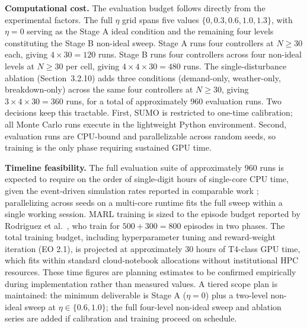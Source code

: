 \textbf{Computational cost.} The evaluation budget follows directly from the experimental factors. The full $\eta$ grid spans five values $\{0, 0.3, 0.6, 1.0, 1.3\}$, with $\eta = 0$ serving as the Stage A ideal condition and the remaining four levels constituting the Stage B non-ideal sweep. Stage A runs four controllers at $N \geq 30$ each, giving $4 \times 30 = 120$ runs. Stage B runs four controllers across four non-ideal levels at $N \geq 30$ per cell, giving $4 \times 4 \times 30 = 480$ runs. The single-disturbance ablation (Section~3.2.10) adds three conditions (demand-only, weather-only, breakdown-only) across the same four controllers at $N \geq 30$, giving $3 \times 4 \times 30 = 360$ runs, for a total of approximately 960 evaluation runs. Two decisions keep this tractable. First, SUMO is restricted to one-time calibration; all Monte Carlo runs execute in the lightweight Python environment. Second, evaluation runs are CPU-bound and parallelizable across random seeds, so training is the only phase requiring sustained GPU time.

\textbf{Timeline feasibility.} The full evaluation suite of approximately $960$ runs is expected to require on the order of single-digit hours of single-core CPU time, given the event-driven simulation rates reported in comparable work \cite{Wangsun,Rodriguez2023Cooperative}; parallelizing across seeds on a multi-core runtime fits the full sweep within a single working session. MARL training is sized to the episode budget reported by Rodriguez et al.~\cite{Rodriguez2023Cooperative}, who train for $500 + 300 = 800$ episodes in two phases. The total training budget, including hyperparameter tuning and reward-weight iteration (EO 2.1), is projected at approximately 30 hours of T4-class GPU time, which fits within standard cloud-notebook allocations without institutional HPC resources. These time figures are planning estimates to be confirmed empirically during implementation rather than measured values. A tiered scope plan is maintained: the minimum deliverable is Stage A ($\eta = 0$) plus a two-level non-ideal sweep at $\eta \in \{0.6, 1.0\}$; the full four-level non-ideal sweep and ablation series are added if calibration and training proceed on schedule.